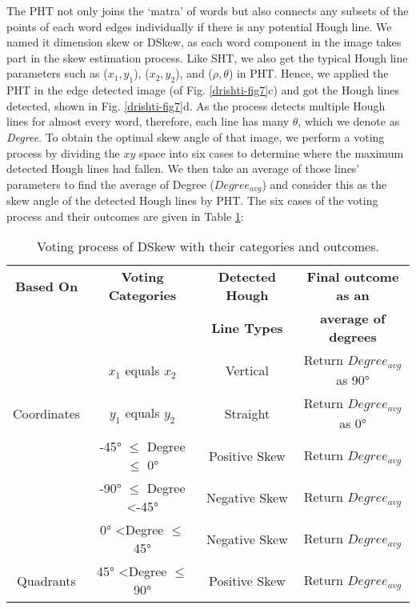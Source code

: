 \documentclass[runningheads]{llncs}
\begin{document}
The PHT not only joins the `matra' of words but also connects any subsets of the points of each word edges individually if there is any potential Hough line. We named it dimension skew or DSkew, as each word component in the image takes part in the skew estimation process. Like SHT, we also get the typical Hough line parameters such as ($x_1, y_1$), ($x_2, y_2$), and ($\rho, \theta$) in PHT. Hence, we applied the PHT in the edge detected image (of Fig. \ref{drishti-fig7}c) and got the Hough lines detected, shown in Fig. \ref{drishti-fig7}d. As the process detects multiple Hough lines for almost every word, therefore, each line has many $\theta$, which we denote as \textit{Degree}. To obtain the optimal skew angle of that image, we perform a voting process by dividing the $xy$ space into six cases to determine where the maximum detected Hough lines had fallen. We then take an average of those lines' parameters to find the average of Degree ($Degree_{avg}$) and consider this as the skew angle of the detected Hough lines by PHT. The six cases of the voting process and their outcomes are given in Table \ref{drishti-tab2}:

\begin{table}[h]
\vspace{-4mm}
\centering
\caption{Voting process of DSkew with their categories and outcomes.}\label{drishti-tab2}
\begin{tabular}{|c|c|c|c|}
\hline
\textbf{Based   On} & \textbf{Voting   Categories} & \textbf{Detected Hough} & \textbf{Final   outcome as an} \\
 &  & \textbf{Line Types} & \textbf{average of degrees} \\ \hline
 & $x_1$ equals $x_2$ & Vertical & Return $Degree_{avg}$  as  90° \\ \cline{2-4} 
\multirow{-2}{*}{Coordinates} & $y_1$ equals $y_2$ & Straight & Return $Degree_{avg}$ as 0° \\ \hline
 & -45°   $\le$ Degree $\le$ 0° & Positive   Skew & Return   $Degree_{avg}$ \\ \cline{2-4} 
 & -90°   $\le$ Degree \textless -45° & Negative   Skew & Return   $Degree_{avg}$ \\ \cline{2-4} 
 & 0°   \textless Degree $\le$ 45° & Negative   Skew & Return   $Degree_{avg}$ \\ \cline{2-4} 
\multirow{-4}{*}{Quadrants} & 45°   \textless Degree $\le$ 90° & Positive   Skew & Return   $Degree_{avg}$ \\ \hline
\end{tabular}
\vspace{-8mm}
\end{table}
\end{document}
